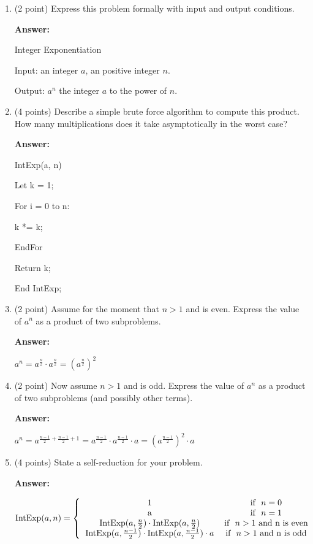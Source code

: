 \documentclass[paper=a4, fontsize=11pt]{scrartcl}
\newcommand\tab[1][0.6cm]{\hspace*{#1}}
\numberwithin{equation}{section}		%
\numberwithin{figure}{section}			%
\numberwithin{table}{section}				%
\begin{document}
\begin{enumerate}
\item (2 point) Express this problem formally with input and output conditions.

\textbf{Answer:}

Integer Exponentiation

Input: an integer $a$, an positive integer $n$.

Output: $a^n$ the integer $a$ to the power of $n$.


\item (4 points) Describe a simple brute force algorithm to compute this product.  How many multiplications does it take asymptotically in the worst case?

\textbf{Answer:}

IntExp(a, n)

\tab Let k = 1;

\tab For i = 0 to n:

\tab \tab k *= k;

\tab EndFor

\tab Return k;

End IntExp;

\item (2 point) Assume for the moment that $n>1$ and is even.  Express the value of $a^n$ as a product of two subproblems.

\textbf{Answer:}

$a^n = a^{\frac{n}{2}} \cdot a^{\frac{n}{2}} = (a^{\frac{n}{2}})^2$

\item (2 point) Now assume $n > 1$ and is odd.  Express the value of $a^n$ as a product of two subproblems (and possibly other terms).

\textbf{Answer:}

$a^n = a^{\frac{n-1}{2} + \frac{n-1}{2} + 1} = a^{\frac{n-1}{2}} \cdot a^{\frac{n-1}{2}} \cdot a = (a^{\frac{n-1}{2}})^2 \cdot a$

\item (4 points) State a self-reduction for your problem.

\textbf{Answer:}

\[
\text{IntExp}(a, n) = \left\{
\begin{tabular}{cc}
1 & \text{if } $n = 0$ \\
a & \text{if } $n=1$ \\
$\text{IntExp}(a, \frac{n}{2}) \cdot \text{IntExp}(a, \frac{n}{2}) $ & \text{if } $n>1$ and n is even \\
$\text{IntExp}(a, \frac{n-1}{2}) \cdot \text{IntExp}(a, \frac{n-1}{2}) \cdot  a$ & \text{if } $n>1$ and n is odd \\
\end{tabular}\right.
\]



\end{enumerate}
\end{document}
